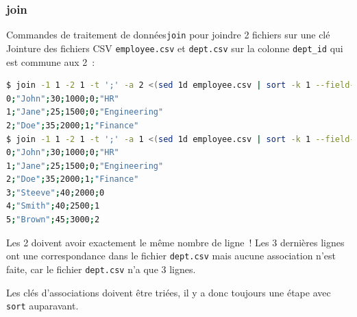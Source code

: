 \documentclass{beamer}
\begin{document}
    \subsubsection{join}\label{subsubsec:join}
    \begin{frame}[fragile]{Commandes de traitement de données}{\lstinline{join} pour joindre 2 fichiers sur une clé}
        Jointure des fichiers CSV \lstinline{employee.csv} et \lstinline{dept.csv} sur la colonne \lstinline{dept_id} qui est commune aux 2~:
        \begin{lstlisting}[language=bash,basicstyle=\tiny\ttfamily]
$ join -1 1 -2 1 -t ';' -a 2 <(sed 1d employee.csv | sort -k 1 --field-separator=';') <(sed 1d dept.csv | sort -k 1 --field-separator=';')
0;"John";30;1000;0;"HR"
1;"Jane";25;1500;0;"Engineering"
2;"Doe";35;2000;1;"Finance"
$ join -1 1 -2 1 -t ';' -a 1 <(sed 1d employee.csv | sort -k 1 --field-separator=';') <(sed 1d dept.csv | sort -k 1 --field-separator=';')
0;"John";30;1000;0;"HR"
1;"Jane";25;1500;0;"Engineering"
2;"Doe";35;2000;1;"Finance"
3;"Steeve";40;2000;0
4;"Smith";40;2500;1
5;"Brown";45;3000;2
        \end{lstlisting}
        \begin{dangercolorbox}
            Les 2 doivent avoir exactement le même nombre de ligne~!
            Les 3 dernières lignes ont une correspondance dans le fichier \lstinline{dept.csv} mais aucune association n'est faite, car le fichier \lstinline{dept.csv} n'a que 3 lignes.

            Les clés d'associations doivent être triées, il y a donc toujours une étape avec \lstinline{sort} auparavant.
        \end{dangercolorbox}
    \end{frame}
\end{document}
